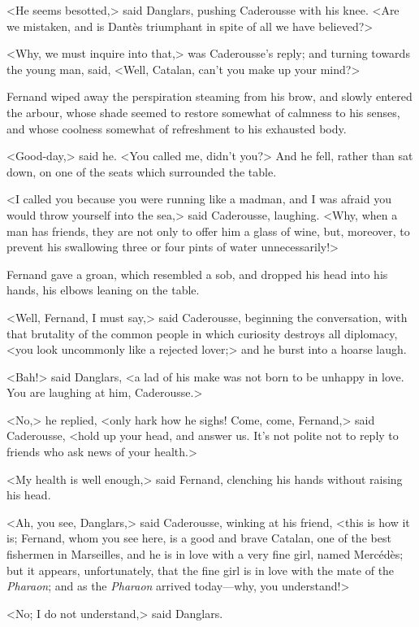 <He seems besotted,> said Danglars, pushing Caderousse with his knee. <Are we mistaken, and is Dantès triumphant in spite of all we have believed?> 

 <Why, we must inquire into that,> was Caderousse's reply; and turning towards the young man, said, <Well, Catalan, can't you make up your mind?> 

 Fernand wiped away the perspiration steaming from his brow, and slowly entered the arbour, whose shade seemed to restore somewhat of calmness to his senses, and whose coolness somewhat of refreshment to his exhausted body. 

 <Good-day,> said he. <You called me, didn't you?> And he fell, rather than sat down, on one of the seats which surrounded the table. 

 <I called you because you were running like a madman, and I was afraid you would throw yourself into the sea,> said Caderousse, laughing. <Why, when a man has friends, they are not only to offer him a glass of wine, but, moreover, to prevent his swallowing three or four pints of water unnecessarily!> 

 Fernand gave a groan, which resembled a sob, and dropped his head into his hands, his elbows leaning on the table. 

 <Well, Fernand, I must say,> said Caderousse, beginning the conversation, with that brutality of the common people in which curiosity destroys all diplomacy, <you look uncommonly like a rejected lover;> and he burst into a hoarse laugh. 

 <Bah!> said Danglars, <a lad of his make was not born to be unhappy in love. You are laughing at him, Caderousse.> 

 <No,> he replied, <only hark how he sighs! Come, come, Fernand,> said Caderousse, <hold up your head, and answer us. It's not polite not to reply to friends who ask news of your health.> 

 <My health is well enough,> said Fernand, clenching his hands without raising his head. 

 <Ah, you see, Danglars,> said Caderousse, winking at his friend, <this is how it is; Fernand, whom you see here, is a good and brave Catalan, one of the best fishermen in Marseilles, and he is in love with a very fine girl, named Mercédès; but it appears, unfortunately, that the fine girl is in love with the mate of the \textit{Pharaon}; and as the \textit{Pharaon} arrived today—why, you understand!> 

 <No; I do not understand,> said Danglars. 

